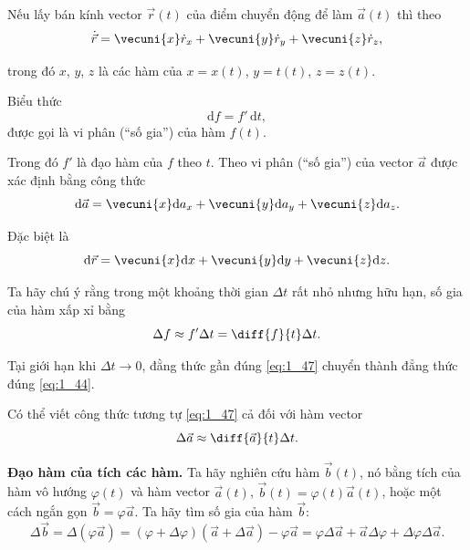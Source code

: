 \noindent
Nếu lấy bán kính vector $\vec{r}(t)$ của điểm chuyển động để làm $\vec{a}(t)$ thì theo 
\begin{equation}\label{eq:1_43}
\dot{\vec{r}} = \vecuni{x}\dot{r}_x + \vecuni{y}\dot{r}_y + \vecuni{z}\dot{r}_z,
\end{equation}

\noindent
trong đó $x$, $y$, $z$ là các hàm của $x=x(t)$, $y=t(t)$, $z=z(t)$.

Biểu thức
\begin{equation}\label{eq:1_44}
\mathrm{d}f = f'\, \mathrm{d}t,
\end{equation}
được gọi là vi phân (``số gia'') của hàm $f(t)$.

\noindent
Trong đó $f'$ là đạo hàm của $f$ theo $t$.  Theo  vi phân (``số gia'') của vector $\vec{a}$ được xác định bằng công thức
\begin{equation}\label{eq:1_45}
\mathrm{d}\vec{a} = \vecuni{x}\mathrm{d}a_x + \vecuni{y}\mathrm{d}a_y + \vecuni{z}\mathrm{d}a_z.
\end{equation}

Đặc biệt là
\begin{equation}\label{eq:1_46}
\mathrm{d}\vec{r} = \vecuni{x}\mathrm{d}x + \vecuni{y}\mathrm{d}y + \vecuni{z}\mathrm{d}z.
\end{equation}

Ta hãy chú ý rằng trong một khoảng thời gian $\Delta t$ rất nhỏ nhưng hữu hạn, số gia của hàm xấp xỉ bằng
\begin{equation}\label{eq:1_47}
\Delta f \approx f'\Delta t = \diff{f}{t}\Delta t.
\end{equation}

\noindent
Tại giới hạn khi $\Delta t\to 0$, đằng thức gần đúng \eqref{eq:1_47} chuyển thành đẳng thức đúng \eqref{eq:1_44}.

Có thể viết công thức tương tự \eqref{eq:1_47} cả đối với hàm vector
\begin{equation}\label{eq:1_48}
\Delta\vec{a} \approx \diff{\vec{a}}{t}\Delta t.
\end{equation}

\textbf{Đạo hàm của tích các hàm.} Ta hãy nghiên cứu hàm $\vec{b}(t)$, nó bằng tích của hàm vô hướng $\varphi(t)$ và hàm vector $\vec{a}(t)$, $\vec{b}(t)=\varphi(t)\vec{a}(t)$, hoặc một cách ngắn gọn $\vec{b}=\varphi\vec{a}$. Ta hãy tìm số gia của hàm $\vec{b}$:
\begin{equation*}
\Delta\vec{b} = \Delta(\varphi\vec{a}) = (\varphi + \Delta\varphi)(\vec{a} + \Delta\vec{a}) - \varphi\vec{a} = \varphi\Delta\vec{a} + \vec{a}\Delta\varphi + \Delta\varphi\Delta\vec{a}.
\end{equation*}

